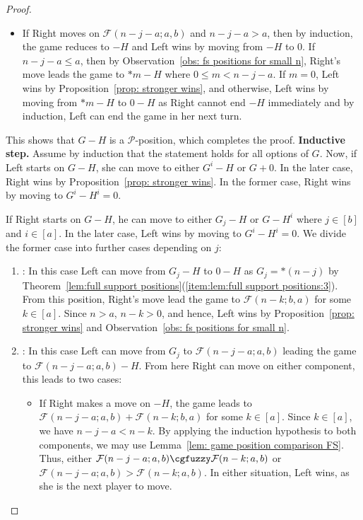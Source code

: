 \documentclass[oneside,reqno]{amsart}
\newcommand{\fs}{\mathcal{F}}
\begin{document}
\begin{proof}
\begin{enumerate}
\begin{itemize}
            \item If Right moves on $\fs(n-j-a;a,b)$ and $n-j-a>a$, then by induction, the game reduces to $-H$ and Left wins by moving from $-H$ to 0. If $n-j-a\le a $, then by Observation~\ref{obs: fs positions for small n}, Right's move leads the game to $*m-H$ where $0\le m<n-j-a$. If $m=0$, Left wins by Proposition~\ref{prop: stronger wins}, and otherwise, Left wins by moving from $*m-H$ to $0-H$ as Right cannot end $-H$ immediately and by induction, Left can end the game in her next turn. 
        \end{itemize}
    \end{enumerate}This shows that $G-H$ is a $\mathscr{P}$-position, which completes the proof. 
    \iffalse
    \textbf{Inductive step.} Assume by induction that the statement holds for all options of $G$.
    Now, if Left starts on $G-H$, she can move to either $G^i-H$ or $G+0$. In the later case, Right wins by Proposition~\ref{prop: stronger wins}. In the former case, Right wins by moving to $G^i-H^i=0$. 

    If Right starts on $G-H$, he can move to either $G_j-H$ or $G-H^i$ where $j\in [b]$ and $i\in [a]$. In the later case, Left wins by moving to $G^i-H^i=0$. We divide the former case into further cases depending on $j$:

    \begin{enumerate}
        \item {}: In this case Left can move from $G_j-H$ to $0-H$ as $G_j=*(n-j)$ by Theorem~\ref{lem:full support positions}(\ref{item:lem:full support positions:3}). From this position, Right's move lead the game to $\fs(n-k;b,a)$ for some $k\in[a]$. Since $n>a$, $n-k>0$, and hence, Left wins by Proposition~\ref{prop: stronger wins} and Observation~\ref{obs: fs positions for small n}.

        \item {}: In this case Left can move from $G_j$ to $\fs(n-j-a;a,b)$ leading the game to $\fs(n-j-a;a,b)-H$. From here Right can move on either component, this leads to two cases:
        \begin{itemize}
            \item If Right makes a move on $-H$, the game leads to $\fs(n-j-a;a,b)+\fs(n-k;b,a)$ for some $k\in[a]$. Since $k\in[a]$, we have $n-j-a<n-k$. By applying the induction hypothesis to both components, we may use Lemma~\ref{lem: game position comparison FS}. Thus, either $\fs(n-j-a;a,b)\cgfuzzy\fs(n-k;a,b)$ or $\fs(n-j-a;a,b)>\fs(n-k;a,b)$. In either situation, Left wins, as she is the next player to move.


\end{itemize}
\end{enumerate}
\end{proof}
\end{document}

